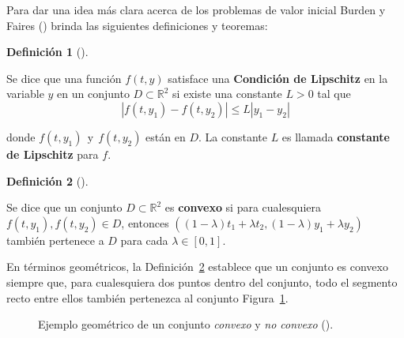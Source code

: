 \documentclass[
  spanish,
  us-letterpaper,
]{scrreprt}
\theoremstyle{plain}
\theoremstyle{definition}
\newtheorem{definition}{Definición}[chapter]
\theoremstyle{remark}
\begin{document}
Para dar una idea más clara acerca de los problemas de valor inicial
Burden y Faires () brinda las siguientes
definiciones y teoremas:

\begin{definition}[]\protect\hypertarget{def-Lip-con}{}\label{def-Lip-con}

Se dice que una función \(f(t,y)\) satisface una \textbf{Condición de
Lipschitz} en la variable \(y\) en un conjunto
\(D \subset \mathbb{R}^2\) si existe una constante \(L>0\) tal que \[
|f(t,y_1) - f(t,y_2)| \leq L|y_1-y_2|
\]

donde \(f(t,y_1) \ \ \text{y} \ \ f(t,y_2)\) están en \(D\). La
constante \(L\) es llamada \textbf{constante de Lipschitz} para \(f\).

\end{definition}

\begin{definition}[]\protect\hypertarget{def-convex-set}{}\label{def-convex-set}

Se dice que un conjunto \(D \subset \mathbb{R}^2\) es \textbf{convexo}
si para cualesquiera \(f(t,y_1), f(t,y_2) \in D\), entonces
\(((1-\lambda)t_1 + \lambda t_2, (1-\lambda)y_1 + \lambda y_2)\) también
pertenece a \(D\) para cada \(\lambda \in[0,1]\).

\end{definition}

En términos geométricos, la Definición~\ref{def-convex-set} establece
que un conjunto es convexo siempre que, para cualesquiera dos puntos
dentro del conjunto, todo el segmento recto entre ellos también
pertenezca al conjunto Figura~\ref{fig-convx-set}.

\begin{figure}


\caption{\label{fig-convx-set}Ejemplo geométrico de un conjunto
\emph{convexo} y \emph{no convexo} ().}

\end{figure}%
\end{document}
